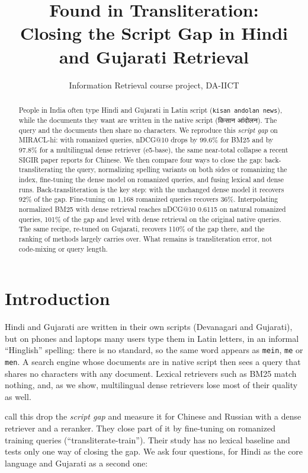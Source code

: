 \documentclass[11pt,a4paper]{article}
\title{Found in Transliteration:\\ Closing the Script Gap in Hindi and Gujarati Retrieval}
\author{%
}
\date{Information Retrieval course project, DA-IICT}
\newcommand{\dev}[1]{{\devfont #1}}
\newcommand{\rom}[1]{\texttt{#1}}          %
\begin{document}
\maketitle

\begin{abstract}
People in India often type Hindi and Gujarati in Latin script (\rom{kisan andolan news}),
while the documents they want are written in the native script (\dev{किसान आंदोलन}). The
query and the documents then share no characters. We reproduce this \emph{script gap} on
MIRACL-hi: with romanized queries, nDCG@10 drops by 99.6\% for BM25 and by 97.8\% for a
multilingual dense retriever (e5-base), the same near-total collapse a recent SIGIR paper
reports for Chinese. We then compare four ways to close the gap: back-transliterating the
query, normalizing spelling variants on both sides or romanizing the index, fine-tuning the
dense model on romanized queries, and fusing lexical and dense runs. Back-transliteration is
the key step: with the unchanged dense model it recovers 92\% of the gap. Fine-tuning on
1,168 romanized queries recovers 36\%. Interpolating normalized BM25 with dense retrieval
reaches nDCG@10 0.6115 on natural romanized queries, 101\% of the gap and level with dense
retrieval on the original native queries. The same recipe, re-tuned on Gujarati, recovers
110\% of the gap there, and the ranking of methods largely carries over. What remains is
transliteration error, not code-mixing or query length.
\end{abstract}

\section{Introduction}

Hindi and Gujarati are written in their own scripts (Devanagari and Gujarati), but on phones
and laptops many users type them in Latin letters, in an informal ``Hinglish'' spelling: there
is no standard, so the same word appears as \rom{mein}, \rom{me} or \rom{men}. A search
engine whose documents are in native script then sees a query that shares no characters with
any document. Lexical retrievers such as BM25 match nothing, and, as we show, multilingual
dense retrievers lose most of their quality as well.

\citet{chari2025lost} call this drop the \emph{script gap} and measure it for Chinese and
Russian with a dense retriever and a reranker. They close part of it by fine-tuning on
romanized training queries (``transliterate-train''). Their study has no lexical baseline and
tests only one way of closing the gap. We ask four questions, for Hindi as the core language
and Gujarati as a second one:
\end{document}
